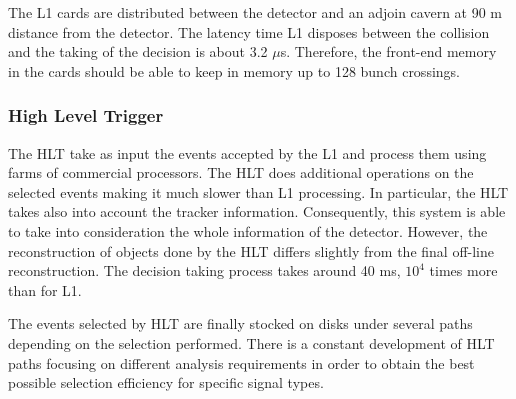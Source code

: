 The L1 cards are distributed between the detector and an adjoin cavern at 90 m distance from the detector. The latency time L1 disposes between the collision and the taking of the decision is about 3.2 $\mu$s. Therefore, the front-end memory in the cards should be able to keep in memory up to 128 bunch crossings. 

\subsubsection{High Level Trigger}
\label{sec:HLT}

The HLT take as input the events accepted by the L1 and process them using farms of commercial processors. The HLT does additional operations on the selected events making it much slower than L1 processing. In particular, the HLT takes also into account the tracker information. Consequently, this system is able to take into consideration the whole information of the detector. However, the reconstruction of objects done by the HLT differs slightly from the final off-line reconstruction. The decision taking process takes around 40 ms, $10^{4}$ times more than for L1. 

The events selected by HLT are finally stocked on disks under several paths depending on the selection performed. There is a constant development of HLT paths focusing on different analysis requirements in order to obtain the best possible selection efficiency for specific signal types. 


